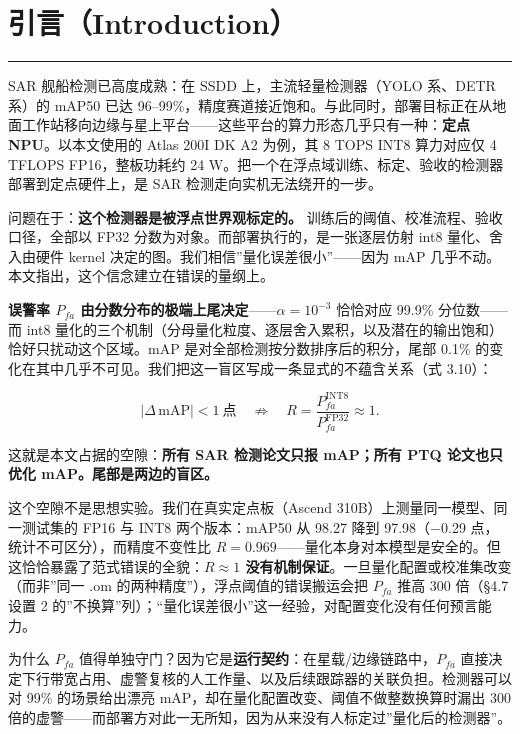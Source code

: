 \section{引言（Introduction）}\label{ux5f15ux8a00introduction}

\begin{center}\rule{0.5\linewidth}{0.5pt}\end{center}

SAR 舰船检测已高度成熟：在 SSDD 上，主流轻量检测器（YOLO 系、DETR 系）的
mAP50 已达
96--99\%，精度赛道接近饱和。与此同时，部署目标正在从地面工作站移向边缘与星上平台------这些平台的算力形态几乎只有一种：\textbf{定点
NPU}。以本文使用的 Atlas 200I DK A2 为例，其 8 TOPS INT8 算力对应仅 4
TFLOPS FP16，整板功耗约 24
W。把一个在浮点域训练、标定、验收的检测器部署到定点硬件上，是 SAR
检测走向实机无法绕开的一步。

问题在于：\textbf{这个检测器是被浮点世界观标定的。}
训练后的阈值、校准流程、验收口径，全部以 FP32
分数为对象。而部署执行的，是一张逐层仿射 int8 量化、舍入由硬件 kernel
决定的图。我们相信''量化误差很小''------因为 mAP
几乎不动。本文指出，这个信念建立在错误的量纲上。

\textbf{误警率 \(P_{fa}\)
由分数分布的极端上尾决定}------\(\alpha=10^{-3}\) 恰恰对应 99.9\%
分位数------而 int8
量化的三个机制（分母量化粒度、逐层舍入累积，以及潜在的输出饱和）恰好只扰动这个区域。mAP
是对全部检测按分数排序后的积分，尾部 0.1\%
的变化在其中几乎不可见。我们把这一盲区写成一条显式的不蕴含关系（式
3.10）：

\[
\big|\Delta\,\mathrm{mAP}\big|<1\ \text{点}\quad\not\Longrightarrow\quad R=\frac{P_{fa}^{\mathrm{INT8}}}{P_{fa}^{\mathrm{FP32}}}\approx 1 .
\]

这就是本文占据的空隙：\textbf{所有 SAR 检测论文只报 mAP；所有 PTQ
论文也只优化 mAP。尾部是两边的盲区。}

这个空隙不是思想实验。我们在真实定点板（Ascend
310B）上测量同一模型、同一测试集的 FP16 与 INT8 两个版本：mAP50 从 98.27
降到 97.98（−0.29 点，统计不可区分），而精度不变性比
\(R=0.969\)------量化本身对本模型是安全的。但这恰恰暴露了范式错误的全貌：\textbf{\(R\approx1\)
没有机制保证}。一旦量化配置或校准集改变（而非''同一 .om
的两种精度''），浮点阈值的错误搬运会把 \(P_{fa}\) 推高 300 倍（§4.7 设置
2
的''不换算''列）；``量化误差很小''这一经验，对配置变化没有任何预言能力。

为什么 \(P_{fa}\)
值得单独守门？因为它是\textbf{运行契约}：在星载/边缘链路中，\(P_{fa}\)
直接决定下行带宽占用、虚警复核的人工作量、以及后续跟踪器的关联负担。检测器可以对
99\% 的场景给出漂亮 mAP，却在量化配置改变、阈值不做整数换算时漏出 300
倍的虚警------而部署方对此一无所知，因为从来没有人标定过''量化后的检测器''。

